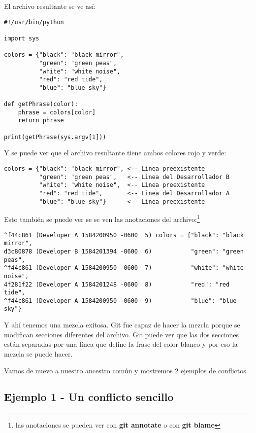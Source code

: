 El archivo resultante se ve así:
\begin{lstlisting}[style=python_style, caption={\bf Ejemplo 0} - código mezclado]
#!/usr/bin/python

import sys

colors = {"black": "black mirror",
          "green": "green peas",
          "white": "white noise",
          "red": "red tide",
          "blue": "blue sky"}

def getPhrase(color):
    phrase = colors[color]
    return phrase

print(getPhrase(sys.argv[1]))
\end{lstlisting}

Y se puede ver que el archivo resultante tiene ambos colores rojo y verde:
\begin{lstlisting}[style=code_section_style, firstnumber=5, caption={\bf Ejemplo 0} - sección de los colores]
colors = {"black": "black mirror", <-- Linea preexistente
          "green": "green peas",   <-- Linea del Desarrollador B
          "white": "white noise",  <-- Linea preexistente
          "red": "red tide",       <-- Linea del Desarrollador A
          "blue": "blue sky"}      <-- Linea preexistente
\end{lstlisting}

Esto también se puede ver se se ven las anotaciones del archivo:\footnote{las anotaciones se pueden ver con
{\bf git annotate} o con {\bf git blame}}

\begin{lstlisting}[style=console_style, basicstyle=\small, caption={\bf Ejemplo 0} - anotaciones]
^f44c861 (Developer A 1584200950 -0600  5) colors = {"black": "black mirror",
d3c80878 (Developer B 1584201394 -0600  6)           "green": "green peas",
^f44c861 (Developer A 1584200950 -0600  7)           "white": "white noise",
4f281f22 (Developer A 1584201248 -0600  8)           "red": "red tide",
^f44c861 (Developer A 1584200950 -0600  9)           "blue": "blue sky"}
\end{lstlisting}

Y ahí tenemos una mezcla exitosa. Git fue capaz de hacer la mezcla porque se modifican secciones diferentes del
archivo. Git puede ver que las dos secciones están separadas por una línea que define la frase del color blanco
y por eso la mezcla se puede hacer.

Vamos de nuevo a nuestro ancestro común y mostremos 2 ejemplos de conflictos.
\subsection{Ejemplo 1 - Un conflicto sencillo}
\label{example_01}

